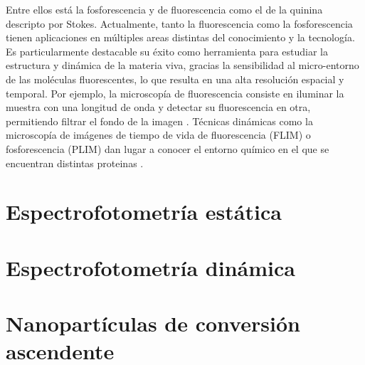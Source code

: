 Entre ellos está la fosforescencia  y de fluorescencia como el de la quinina descripto por Stokes.
Actualmente, tanto la fluorescencia como la fosforescencia tienen aplicaciones en múltiples areas distintas del conocimiento y la tecnología. 
Es particularmente destacable su éxito como herramienta para estudiar la estructura y dinámica de la materia viva, gracias la sensibilidad al micro-entorno de las moléculas fluorescentes, lo que resulta en una alta resolución espacial y temporal. 
Por ejemplo, la microscopía de fluorescencia consiste en iluminar la muestra con una longitud de onda y detectar su fluorescencia en otra, permitiendo filtrar el fondo de la imagen \cite{VALEUR}.
Técnicas dinámicas como la microscopía de imágenes de tiempo de vida de fluorescencia (FLIM) o fosforescencia (PLIM) dan lugar a conocer el entorno químico en el que se encuentran distintas proteinas \todo{[CITA]}.




\section{Espectrofotometría estática}
\section{Espectrofotometría dinámica}
\section{Nanopartículas de conversión ascendente} \label{sec:intro_ucnp}